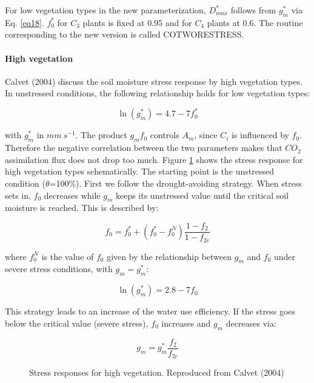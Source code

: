 {For low vegetation types in the new parameterization, $D_{max}^{*}$ follows from $g_{m}^{*}$ via Eq. \ref{eq18}. $f_{0}^{*}$ for $C_{3}$
plants is fixed at 0.95 and for $C_{4}$ plants at 0.6. The routine corresponding to the new version is called
COTWORESTRESS.

\paragraph{High vegetation}

Calvet \etal (2004) discuss the soil moisture stress response by high vegetation types. In unstressed
conditions, the following relationship holds for low vegetation types:

\begin{equation}\label{eq23}
\ln(g_{m}^{*}) = 4.7-7f_{0}^{*}
\end{equation}

with $g_{m}^{*}$ in $mm ~ s^{-1}$. The product $g_{m}f_{0}$ controls $A_{m}$, since $C_{i}$ is influenced by $f_{0}$. Therefore the negative
correlation between the two parameters makes that $CO_{2}$ assimilation flux does not drop too much.
Figure \ref{stresshigh} shows the stress response for high vegetation types schematically.
The starting point is the unstressed condition ($\theta$=100\%). First we follow the drought-avoiding strategy.
When stress sets in, $f_{0}$ decreases while $g_{m}$ keeps its unstressed value until the critical soil moisture is
reached. This is described by:

\begin{equation}
f_{0} = f_{0}^{*} + (f_{0}^{*}-f_{0}^{N}) \frac{1-f_{2}}{1-f_{2c}}
\end{equation}

where $f_{0}^{N}$ is the value of $f_{0}$ given by the relationship between $g_{m}$ and $f_{0}$ under severe stress conditions,
with $g_{m}=g_{m}^{*}$:

\begin{equation}\label{eq25}
\ln(g_{m}^{*}) = 2.8-7f_{0}
\end{equation}

This strategy leads to an increase of the water use efficiency. If the stress goes below the critical value
(severe stress), $f_{0}$ increases and $g_{m}$ decreases via:

\begin{equation}
g_{m} = g_{m}^{*}\frac{f_{2}}{f_{2c}}
\end{equation}

\begin{figure}[h]
\hspace*{2.cm}
\begin{center}
\caption{Stress responses for high vegetation. Reproduced from Calvet \etal (2004)
\label{stresshigh}}
\end{center}
\end{figure}


}

